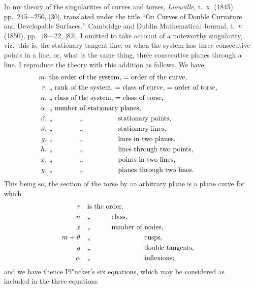\documentclass[11pt,a4paper]{article}
\begin{document}
\noindent
In my theory of the singularities of curves and torses, \textit{Liouville}, t.~\textsc{x}. (1845) pp.~245---250, [30], translated under the title ``On Curves of Double Curvature and Developable Surfaces,'' Cambridge and Dublin Mathematical Journal, t.~\textsc{v}. (1850), pp.~18---22, [83], I omitted to take account of a noteworthy singularity, viz.~this is, the stationary tangent line; or when the system has three consecutive points in a line, or, what is the same thing, three consecutive planes through a line. I reproduce the theory with this addition as follows. We have
\begin{align*}
m, &\ \text{the order of the system, = order of the curve,}\\
r, &\ \text{,, rank of the system, = class of curve, = order of torse,}\\
n, &\ \text{,, class of the system, = class of torse,}\\
\alpha, &\ \text{,, number of stationary planes,}\\
\beta, &\ \text{,, \phantom{number} ,, \phantom{stationary} stationary points,}\\
\vartheta, &\ \text{,, \phantom{number} ,, \phantom{stationary} stationary lines,}\\
g, &\ \text{,, \phantom{number} ,, \phantom{stationary} lines in two planes,}\\
h, &\ \text{,, \phantom{number} ,, \phantom{stationary} lines through two points,}\\
x, &\ \text{,, \phantom{number} ,, \phantom{stationary} points in two lines,}\\
y, &\ \text{,, \phantom{number} ,, \phantom{stationary} planes through two lines.}
\end{align*}
This being so, the section of the torse by an arbitrary plane is a plane curve for which
\begin{align*}
r &\quad \text{is the order,}\\
n &\quad \text{,, \phantom{is the} class,}\\
x &\quad \text{,, \phantom{is the} number of nodes,}\\
m + \vartheta &\quad \text{,, \phantom{is the number of} cusps,}\\
g &\quad \text{,, \phantom{is the number of} double tangents,}\\
\alpha &\quad \text{,, \phantom{is the number of} inflexions;}
\end{align*}
and we have thence Pl"{u}cker's six equations, which may be considered as included in the three equations
\end{document}
